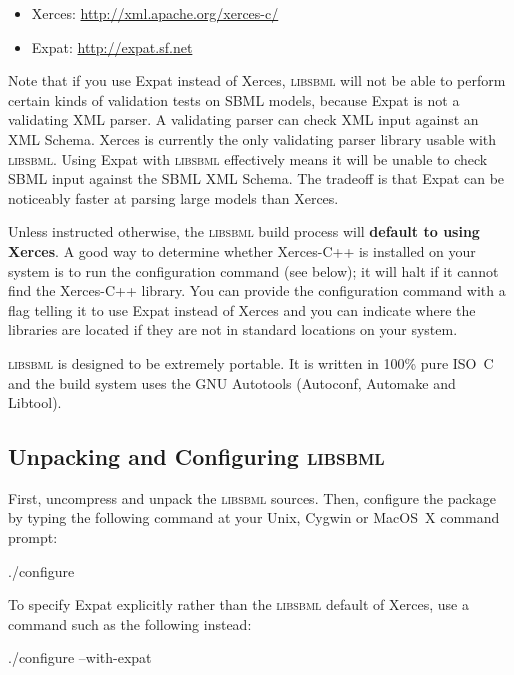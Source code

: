 \documentclass{sbmlmanual}
\newcommand{\libsbml}{\textsc{libsbml}}
\begin{document}
\begin{itemize}\setlength{\parskip}{-0.25ex}

\item Xerces: \url{http://xml.apache.org/xerces-c/}
\item Expat: \url{http://expat.sf.net}

\end{itemize}

Note that if you use Expat instead of Xerces, \libsbml{} will not be able
to perform certain kinds of validation tests on SBML models, because Expat
is not a validating XML parser.  A validating parser can check XML input
against an XML Schema.  Xerces is currently the only validating parser
library usable with \libsbml{}.  Using Expat with \libsbml{} effectively
means it will be unable to check SBML input against the SBML XML Schema.
The tradeoff is that Expat can be noticeably faster at parsing large models
than Xerces.

Unless instructed otherwise, the \libsbml{} build process will
\textbf{default to using Xerces}.  A good way to determine whether
Xerces-C++ is installed on your system is to run the configuration command
(see below); it will halt if it cannot find the Xerces-C++ library.  You
can provide the configuration command with a flag telling it to use Expat
instead of Xerces and you can indicate where the libraries are located if
they are not in standard locations on your system.

\libsbml{} is designed to be extremely portable.  It is written in 100\%
pure ISO~C and the build system uses the GNU Autotools (Autoconf, Automake
and Libtool).  

\subsection{Unpacking and Configuring \libsbml{}}

First, uncompress and unpack the \libsbml{} sources.  Then, configure the
package by typing the following command at your Unix, Cygwin or MacOS~X
command prompt:

\begin{example}[csh]
  ./configure
\end{example}

To specify Expat explicitly rather than the \libsbml{} default of Xerces,
use a command such as the following instead:

\begin{example}[csh]
  ./configure --with-expat
\end{example}
\end{document}
